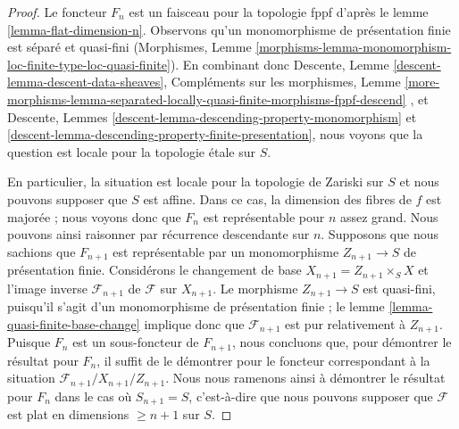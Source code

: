 \begin{proof}
Le foncteur $F_n$ est un faisceau pour la topologie fppf d'après le
lemme \ref{lemma-flat-dimension-n}.
Observons qu'un monomorphisme de présentation finie est
séparé et quasi-fini (Morphismes, Lemme
\ref{morphisms-lemma-monomorphism-loc-finite-type-loc-quasi-finite}).
En combinant donc
Descente, Lemme \ref{descent-lemma-descent-data-sheaves},
Compléments sur les morphismes, Lemme
\ref{more-morphisms-lemma-separated-locally-quasi-finite-morphisms-fppf-descend}
, et
Descente, Lemmes \ref{descent-lemma-descending-property-monomorphism} et
\ref{descent-lemma-descending-property-finite-presentation},
nous voyons que la question est locale pour la topologie \'etale sur $S$.

\medskip\noindent
En particulier, la situation est locale pour la topologie de Zariski sur $S$
et nous pouvons supposer que $S$ est affine. Dans ce cas, la dimension des
fibres de $f$ est majorée ; nous voyons donc que $F_n$ est représentable
pour $n$ assez grand. Nous pouvons ainsi raisonner par récurrence descendante sur $n$.
Supposons que nous sachions que $F_{n + 1}$ est représentable par un monomorphisme
$Z_{n + 1} \to S$ de présentation finie. Considérons le changement de base
$X_{n + 1} = Z_{n + 1} \times_S X$ et l'image inverse $\mathcal{F}_{n + 1}$
de $\mathcal{F}$ sur $X_{n + 1}$. Le morphisme $Z_{n + 1} \to S$ est
quasi-fini, puisqu'il s'agit d'un monomorphisme de présentation finie ; le
lemme \ref{lemma-quasi-finite-base-change}
implique donc que $\mathcal{F}_{n + 1}$ est pur relativement à $Z_{n + 1}$.
Puisque $F_n$ est un sous-foncteur de $F_{n + 1}$, nous concluons que, pour
démontrer le résultat pour $F_n$, il suffit de le démontrer pour le
foncteur correspondant à la situation
$\mathcal{F}_{n + 1}/X_{n + 1}/Z_{n + 1}$.
Nous nous ramenons ainsi à démontrer le résultat pour $F_n$ dans le cas où
$S_{n + 1} = S$, c'est-à-dire que nous pouvons supposer que $\mathcal{F}$ est plat
en dimensions $\geq n + 1$ sur $S$.


\end{proof}
